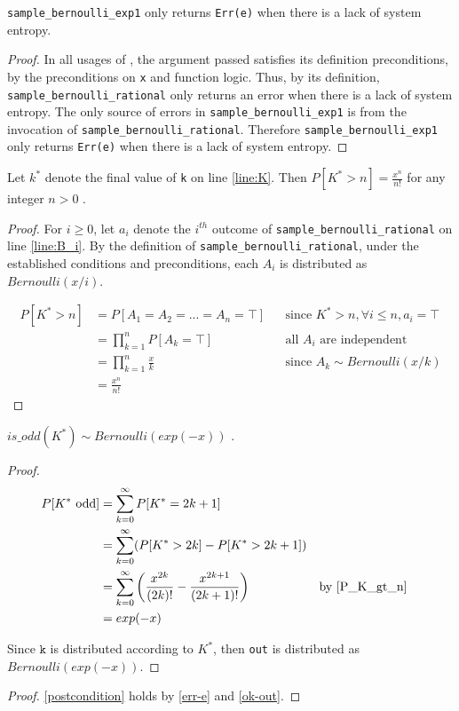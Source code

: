 \documentclass{article}
\begin{document}
\begin{lemma}
    \label{err-e}
    \texttt{sample\_bernoulli\_exp1} only returns \texttt{Err(e)} when there is a lack of system entropy.
\end{lemma}

\begin{proof}
    In all usages of , the argument passed satisfies its definition preconditions,
    by the preconditions on \texttt{x} and function logic.
    Thus, by its definition, \texttt{sample\_bernoulli\_rational} only returns an error when there is a lack of system entropy.
    The only source of errors in \texttt{sample\_bernoulli\_exp1} is from the invocation of \texttt{sample\_bernoulli\_rational}.
    Therefore \texttt{sample\_bernoulli\_exp1} only returns \texttt{Err(e)} when there is a lack of system entropy.
\end{proof}

\begin{lemma}
    \label{P_K_gt_n}
    Let $k^{*}$ denote the final value of \texttt{k} on line \ref{line:K}.
    Then $P[K^{*} > n] = \frac{x^n}{n!}$ for any integer $n > 0$ \cite{CKS20}.
\end{lemma}

\begin{proof}
    For $i \ge 0$, let $a_i$ denote the $i^{th}$ outcome of \texttt{sample\_bernoulli\_rational} on line \ref{line:B_i}.
    By the definition of \texttt{sample\_bernoulli\_rational}, under the established conditions and preconditions,
    each $A_i$ is distributed as $Bernoulli(x / i)$.

    \begin{align*}
        P[K^{*} > n] &= P[A_1 = A_2 = ... = A_n = \top] && \text{since } K^{*} > n, \forall i \leq n, a_i = \top \\
        &= \prod_{k=1}^n P[A_k = \top] && \text{all $A_i$ are independent} \\
        &= \prod_{k=1}^n \frac{x}{k} && \text{since $A_k \sim Bernoulli(x/k)$} \\
        &= \frac{x^n}{n!}
    \end{align*}
\end{proof}

\begin{lemma}
    \label{ok-out}
    $is\_odd(K^{*}) \sim Bernoulli(exp(-x))$ \cite{CKS20}.
\end{lemma}

\begin{proof}
    \begin{align*}
        P[K^{*} \text{ odd}] &= \sum_{k=0}^\infty P[K^{*} = 2k + 1] \\
        &= \sum_{k=0}^\infty (P[K^{*} > 2k] - P[K^{*} > 2k + 1]) \\
        &= \sum_{k=0}^\infty \left(\frac{x^{2k}}{(2k)!} - \frac{x^{2k + 1}}{(2k + 1)!}\right) && \text{by } \ref{P_K_gt_n} \\
        &= exp(-x)
    \end{align*}

    Since $\mathtt{k}$ is distributed according to $K^{*}$, then \texttt{out} is distributed as $Bernoulli(exp(-x))$.
\end{proof}

\begin{proof}
    \ref{postcondition} holds by \ref{err-e} and \ref{ok-out}.
\end{proof}



\end{document}
